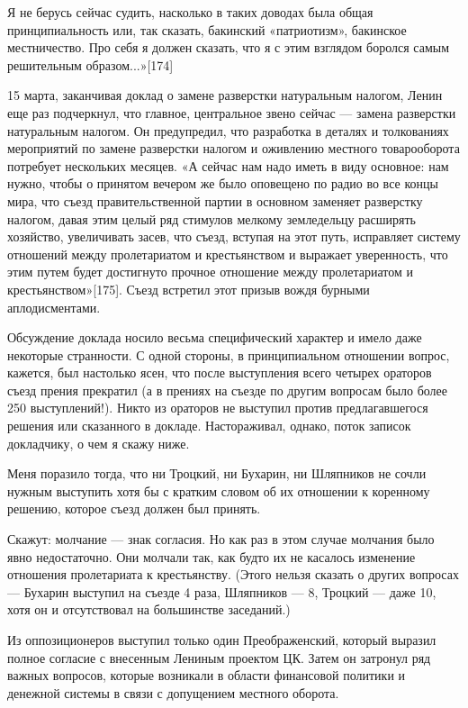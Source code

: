 \documentclass[12pt, a4paper, openany]{book}
\begin{document}
Я не берусь сейчас судить, насколько в таких доводах была общая принципиальность или, так сказать, бакинский «патриотизм», бакинское местничество. Про себя я должен сказать, что я с этим взглядом боролся самым решительным образом...»[174]

15 марта, заканчивая доклад о замене разверстки натуральным налогом, Ленин еще раз подчеркнул, что главное, центральное звено сейчас — замена разверстки натуральным налогом. Он предупредил, что разработка в деталях и толкованиях мероприятий по замене разверстки налогом и оживлению местного товарооборота потребует нескольких месяцев. «А сейчас нам надо иметь в виду основное: нам нужно, чтобы о принятом вечером же было оповещено по радио во все концы мира, что съезд правительственной партии в основном заменяет разверстку налогом, давая этим целый ряд стимулов мелкому земледельцу расширять хозяйство, увеличивать засев, что съезд, вступая на этот путь, исправляет систему отношений между пролетариатом и крестьянством и выражает уверенность, что этим путем будет достигнуто прочное отношение между пролетариатом и крестьянством»[175]. Съезд встретил этот призыв вождя бурными аплодисментами.

Обсуждение доклада носило весьма специфический характер и имело даже некоторые странности. С одной стороны, в принципиальном отношении вопрос, кажется, был настолько ясен, что после выступления всего четырех ораторов съезд прения прекратил (а в прениях на съезде по другим вопросам было более 250 выступлений!). Никто из ораторов не выступил против предлагавшегося решения или сказанного в докладе. Настораживал, однако, поток записок докладчику, о чем я скажу ниже.

Меня поразило тогда, что ни Троцкий, ни Бухарин, ни Шляпников не сочли нужным выступить хотя бы с кратким словом об их отношении к коренному решению, которое съезд должен был принять.

Скажут: молчание — знак согласия. Но как раз в этом случае молчания было явно недостаточно. Они молчали так, как будто их не касалось изменение отношения пролетариата к крестьянству. (Этого нельзя сказать о других вопросах — Бухарин выступил на съезде 4 раза, Шляпников — 8, Троцкий — даже 10, хотя он и отсутствовал на большинстве заседаний.)

Из оппозиционеров выступил только один Преображенский, который выразил полное согласие с внесенным Лениным проектом ЦК. Затем он затронул ряд важных вопросов, которые возникали в области финансовой политики и денежной системы в связи с допущением местного оборота.
\end{document}
